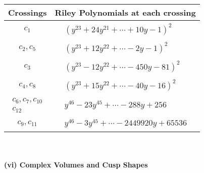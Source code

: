 \documentclass[1p]{elsarticle_modified}
\theoremstyle{definition}
\begin{document}
\begin{tabular}{m{50pt}|m{274pt}}
Crossings & \hspace{64pt}Riley Polynomials at each crossing \\
\hline $$\begin{aligned}c_{1}\end{aligned}$$&$\begin{aligned}
&(y^{23}+24 y^{21}+\cdots+10 y-1)^{2}
\end{aligned}$\\
\hline $$\begin{aligned}c_{2},c_{5}\end{aligned}$$&$\begin{aligned}
&(y^{23}+12 y^{22}+\cdots-2 y-1)^{2}
\end{aligned}$\\
\hline $$\begin{aligned}c_{3}\end{aligned}$$&$\begin{aligned}
&(y^{23}-12 y^{22}+\cdots-450 y-81)^{2}
\end{aligned}$\\
\hline $$\begin{aligned}c_{4},c_{8}\end{aligned}$$&$\begin{aligned}
&(y^{23}+15 y^{22}+\cdots-40 y-16)^{2}
\end{aligned}$\\
\hline $$\begin{aligned}c_{6},c_{7},c_{10}\\c_{12}\end{aligned}$$&$\begin{aligned}
&y^{46}-23 y^{45}+\cdots-288 y+256
\end{aligned}$\\
\hline $$\begin{aligned}c_{9},c_{11}\end{aligned}$$&$\begin{aligned}
&y^{46}-3 y^{45}+\cdots-2449920 y+65536
\end{aligned}$\\
\hline
\end{tabular}\\~\\
\newpage\flushleft \textbf{(vi) Complex Volumes and Cusp Shapes}
\end{document}
